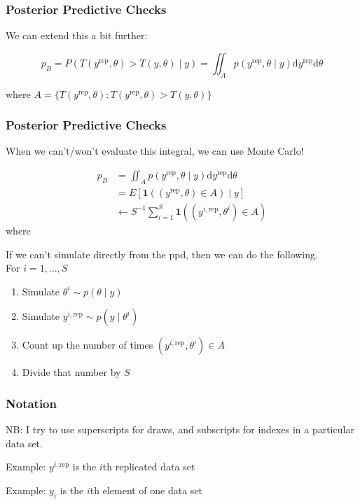 \documentclass{beamer}
\begin{document}
\begin{frame}
\frametitle{Posterior Predictive Checks}

We can extend this a bit further:

\[
p_B = P(T(y^{\text{rep}}, \theta) > T(y, \theta) \mid y) = \iint_{A} p(y^{\text{rep}}, \theta \mid y) \text{d} y^{\text{rep}}\text{d} \theta
\]

where $A = \{T(y^{\text{rep}}, \theta) : T(y^{\text{rep}}, \theta) > T(y, \theta) \}$

\end{frame}



\begin{frame}
\frametitle{Posterior Predictive Checks}

When we can't/won't evaluate this integral, we can use Monte Carlo!

\begin{align*}
p_B &= \iint_{A} p(y^{\text{rep}}, \theta \mid y) \text{d} y^{\text{rep}}\text{d} \theta \\
&= E \left[ \mathbf{1}( (y^{\text{rep}}, \theta) \in A) \mid y\right] \\
&\leftarrow S^{-1}\sum_{i=1}^S \mathbf{1}( (y^{i,\text{rep}}, \theta^i) \in A) 
\end{align*}
where 

If we can't simulate directly from the ppd, then we can do the following. \\
For $i=1,\ldots,S$
\begin{enumerate}
\item Simulate $\theta^i \sim p(\theta \mid y)$
\item Simulate $y^{i,\text{rep}} \sim p(y \mid \theta^i)$
\item Count up the number of times $(y^{i,\text{rep}}, \theta^i) \in A$
\item Divide that number by $S$
\end{enumerate}

\end{frame}

\begin{frame}
\frametitle{Notation}

NB: I try to use superscripts for draws, and subscripts for indexes in a particular data set.
\newline

Example: $y^{i,\text{rep}}$ is the $i$th replicated data set
\newline

Example: $y_i$ is the $i$th element of one data set

\end{frame}
\end{document}
